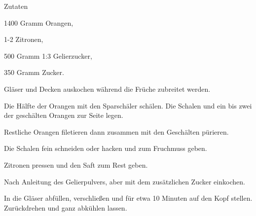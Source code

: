 \startsection[title={Orangenmarmelade},reference=cujamara]

\startitemize
\item Zutaten
      \startitemize
      \item 1400 Gramm Orangen,
      \item 1-2 Zitronen,
      \item 500 Gramm 1:3 Gelierzucker,
      \item 350 Gramm Zucker.
      \stopitemize

\item Gläser und Decken auskochen während die Früche zubreitet werden.
\item Die Hälfte der Orangen mit den Sparschäler schälen. Die Schalen
      und ein bis zwei der geschälten Orangen zur Seite legen.
\item Restliche Orangen filetieren dann zusammen mit den Geschälten
      pürieren.
\item Die Schalen fein schneiden oder hacken und zum Fruchmuss geben.
\item Zitronen pressen und den Saft zum Rest geben.
\item Nach Anleitung des Gelierpulvers, aber mit dem zusätzlichen Zucker
      einkochen.
\item In die Gläser abfüllen, verschließen und für etwa 10 Minuten
      auf den Kopf stellen. Zurückdrehen und ganz abkühlen lassen.
\stopitemize

\stopsection
